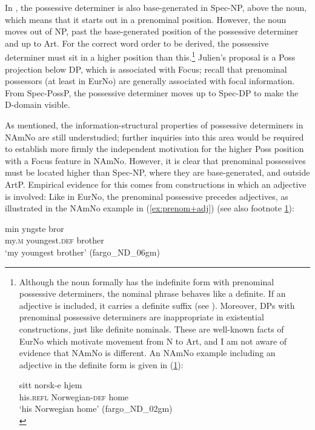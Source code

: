 \documentclass[output=paper,colorlinks,citecolor=brown]{langscibook}
\begin{document}
In , the possessive determiner is also base\hyp generated in Spec-NP, above the noun, which means that it starts out in a prenominal position. However, the noun moves out of NP, past the base-generated position of the possessive determiner and up to Art. For the correct word order to be derived, the possessive determiner must sit in a higher position than this.\footnote{\label{footnote:prenom}Although the noun formally has the indefinite form with prenominal possessive determiners, the nominal phrase  behaves like a definite. If an adjective is included, it carries a definite suffix (see ). Moreover, DPs with prenominal possessive determiners are inappropriate in existential constructions, just like definite nominals.  These are well-known facts of EurNo  which motivate movement from N to Art, and I am not aware of evidence that NAmNo is different.  An NAmNo example including an adjective in the definite form is given in (\ref{ex:sittnorskehjem}):


\ea \label{ex:sittnorskehjem} 
\gll sitt norsk-e hjem\\
his.\textsc{refl} Norwegian-\textsc{def} home\\
\glt `his Norwegian home' (fargo\_ND\_02gm)\\
\z 



} Julien's \citeyearpar{julien2005nominals} proposal is a Poss projection below DP, which is associated with Focus; recall that prenominal possessors (at least in EurNo) are generally associated with focal information. From Spec-PossP, the possessive determiner moves up to Spec-DP to make the D-domain visible. 

As mentioned, the information-structural properties of possessive determiners in NAmNo are still understudied; further inquiries into this area would be required to establish more firmly the independent motivation for the higher Poss position with a Focus feature in NAmNo. However, it is clear that prenominal possessives must be located higher than Spec-NP, where they are base\hyp generated, and outside  ArtP. Empirical evidence for this comes from constructions in which an adjective is involved: Like in EurNo, the prenominal possessive precedes adjectives, as illustrated in the NAmNo example in (\ref{ex:prenom+adj}) (see also footnote \ref{footnote:prenom}):

\ea \label{ex:prenom+adj} \gll min yngste bror\\
my.\textsc{m} youngest.\textsc{def} brother\\
\glt `my youngest brother' (fargo\_ND\_06gm)
\z 
\end{document}
